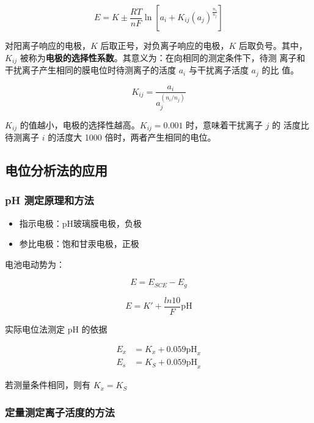 \begin{equation}
    E = K \pm \frac{RT}{nF} \ln \left[ a_i + K_{ij} (a_j)^{\frac{n_i}{n_j}}
        \right]
\end{equation}


对阳离子响应的电极，$K$ 后取正号，对负离子响应的电极，$K$ 后取负号。其中，
$K_{ij}$ 被称为\textbf{电极的选择性系数}。其意义为：在向相同的测定条件下，待测
离子和干扰离子产生相同的膜电位时待测离子的活度 $a_i$ 与干扰离子活度 $a_j$ 的比
值。

\begin{equation}
    K_{ij} = \frac{a_i}{a_j^{(n_i/n_j)}}
\end{equation}


$K_{ij}$ 的值越小，电极的选择性越高。$K_{ij} = 0.001$ 时，意味着干扰离子 $j$ 的
活度比待测离子 $i$ 的活度大 1000 倍时，两者产生相同的电位。

\subsection{电位分析法的应用}

\subsubsection{pH 测定原理和方法}

\begin{itemize}
    \item 指示电极：pH玻璃膜电极，负极
    \item 参比电极：饱和甘汞电极，正极
\end{itemize}

电池电动势为：

\begin{equation}
    E = E_{SCE} - E_{g}
\end{equation}

\begin{equation}
    E = K' + \frac{ln 10}{F}\mathrm{pH}
\end{equation}

实际电位法测定 pH 的依据

\begin{align}
    E_x & = K_x + 0.059 \mathrm{pH}_x \\
    E_s & = K_S + 0.059 \mathrm{pH}_x
\end{align}

若测量条件相同，则有 $K_x = K_S$

\subsubsection{定量测定离子活度的方法}

